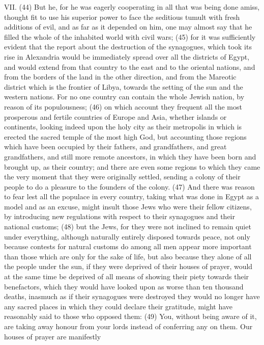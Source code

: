 VII. (44) But he, for he was eagerly cooperating in all that was being done amiss, thought fit to use
his superior power to face the seditious tumult with fresh additions of evil, and as far as it
depended on him, one may almost say that he filled the whole of the inhabited world with civil wars;
(45) for it was sufficiently evident that the report about the destruction of the synagogues, which
took its rise in Alexandria would be immediately spread over all the districts of Egypt, and would
extend from that country to the east and to the oriental nations, and from the borders of the land in
the other direction, and from the Mareotic district which is the frontier of Libya, towards the setting
of the sun and the western nations. For no one country can contain the whole Jewish nation, by
reason of its populousness; (46) on which account they frequent all the most prosperous and
fertile countries of Europe and Asia, whether islands or continents, looking indeed upon the holy
city as their metropolis in which is erected the sacred temple of the most high God, but accounting
those regions which have been occupied by their fathers, and grandfathers, and great
grandfathers, and still more remote ancestors, in which they have been born and brought up, as
their country; and there are even some regions to which they came the very moment that they were
originally settled, sending a colony of their people to do a pleasure to the founders of the colony.
(47) And there was reason to fear lest all the populace in every country, taking what was done in
Egypt as a model and as an excuse, might insult those Jews who were their fellow citizens, by
introducing new regulations with respect to their synagogues and their national customs; (48) but
the Jews, for they were not inclined to remain quiet under everything, although naturally entirely
disposed towards peace, not only because contests for natural customs do among all men appear
more important than those which are only for the sake of life, but also because they alone of all the
people under the sun, if they were deprived of their houses of prayer, would at the same time be
deprived of all means of showing their piety towards their benefactors, which they would have
looked upon as worse than ten thousand deaths, inasmuch as if their synagogues were destroyed
they would no longer have any sacred places in which they could declare their gratitude, might have
reasonably said to those who opposed them: (49) You, without being aware of it, are taking away
honour from your lords instead of conferring any on them. Our houses of prayer are manifestly
